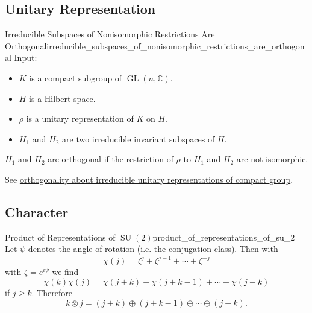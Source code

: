 \documentclass{article}
\begin{document}
\subsection{Unitary Representation}

\begin{theorem}{Irreducible Subspaces of Nonisomorphic Restrictions Are Orthogonal}{irreducible_subspaces_of_nonisomorphic_restrictions_are_orthogonal}
    Input:
    \begin{itemize}
        \item $K$ is a compact subgroup of $\operatorname{GL}(n,\mathbb{C})$.
        \item $H$ is a Hilbert space.
        \item $\rho$ is a unitary representation of $K$ on $H$.
        \item $H_1$ and $H_2$ are two irreducible invariant subspaces of $H$.
    \end{itemize}
    $H_1$ and $H_2$ are orthogonal if the restriction of $\rho$ to $H_1$ and $H_2$ are not isomorphic.
\end{theorem}
See \href{https://math.stackexchange.com/questions/3529154/orthogonality-about-irreducible-unitary-representations-of-compact-group}{orthogonality about irreducible unitary representations of compact group}.

\subsection{Character}

\begin{example}{Product of Representations of $\operatorname{SU}(2)$}{product_of_representations_of_su_2}
    Let $\psi$ denotes the angle of rotation (i.e. the conjugation class).
    Then with
    \[ \chi(j) = \zeta^j + \zeta^{j-1} + \cdots + \zeta^{-j} \]
    with $\zeta = e^{i\psi}$ we find
    \[ \chi(k)\chi(j) = \chi(j+k) + \chi(j+k-1) + \cdots + \chi(j-k) \]
    if $j\ge k$.
    Therefore
    \[ k\otimes j = (j+k) \oplus (j+k-1) \oplus \cdots \oplus (j-k). \]
\end{example}
\end{document}
